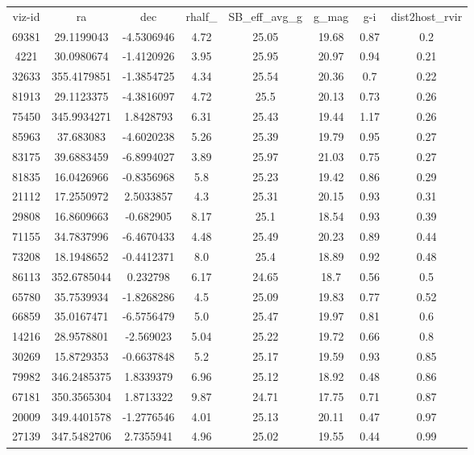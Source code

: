 \begin{table}
\begin{tabular}{cccccccc}
viz-id & ra & dec & rhalf_ & SB_eff_avg_g & g_mag & g-i & dist2host_rvir \\
69381 & 29.1199043 & -4.5306946 & 4.72 & 25.05 & 19.68 & 0.87 & 0.2 \\
4221 & 30.0980674 & -1.4120926 & 3.95 & 25.95 & 20.97 & 0.94 & 0.21 \\
32633 & 355.4179851 & -1.3854725 & 4.34 & 25.54 & 20.36 & 0.7 & 0.22 \\
81913 & 29.1123375 & -4.3816097 & 4.72 & 25.5 & 20.13 & 0.73 & 0.26 \\
75450 & 345.9934271 & 1.8428793 & 6.31 & 25.43 & 19.44 & 1.17 & 0.26 \\
85963 & 37.683083 & -4.6020238 & 5.26 & 25.39 & 19.79 & 0.95 & 0.27 \\
83175 & 39.6883459 & -6.8994027 & 3.89 & 25.97 & 21.03 & 0.75 & 0.27 \\
81835 & 16.0426966 & -0.8356968 & 5.8 & 25.23 & 19.42 & 0.86 & 0.29 \\
21112 & 17.2550972 & 2.5033857 & 4.3 & 25.31 & 20.15 & 0.93 & 0.31 \\
29808 & 16.8609663 & -0.682905 & 8.17 & 25.1 & 18.54 & 0.93 & 0.39 \\
71155 & 34.7837996 & -6.4670433 & 4.48 & 25.49 & 20.23 & 0.89 & 0.44 \\
73208 & 18.1948652 & -0.4412371 & 8.0 & 25.4 & 18.89 & 0.92 & 0.48 \\
86113 & 352.6785044 & 0.232798 & 6.17 & 24.65 & 18.7 & 0.56 & 0.5 \\
65780 & 35.7539934 & -1.8268286 & 4.5 & 25.09 & 19.83 & 0.77 & 0.52 \\
66859 & 35.0167471 & -6.5756479 & 5.0 & 25.47 & 19.97 & 0.81 & 0.6 \\
14216 & 28.9578801 & -2.569023 & 5.04 & 25.22 & 19.72 & 0.66 & 0.8 \\
30269 & 15.8729353 & -0.6637848 & 5.2 & 25.17 & 19.59 & 0.93 & 0.85 \\
79982 & 346.2485375 & 1.8339379 & 6.96 & 25.12 & 18.92 & 0.48 & 0.86 \\
67181 & 350.3565304 & 1.8713322 & 9.87 & 24.71 & 17.75 & 0.71 & 0.87 \\
20009 & 349.4401578 & -1.2776546 & 4.01 & 25.13 & 20.11 & 0.47 & 0.97 \\
27139 & 347.5482706 & 2.7355941 & 4.96 & 25.02 & 19.55 & 0.44 & 0.99 \\
\end{tabular}
\end{table}
